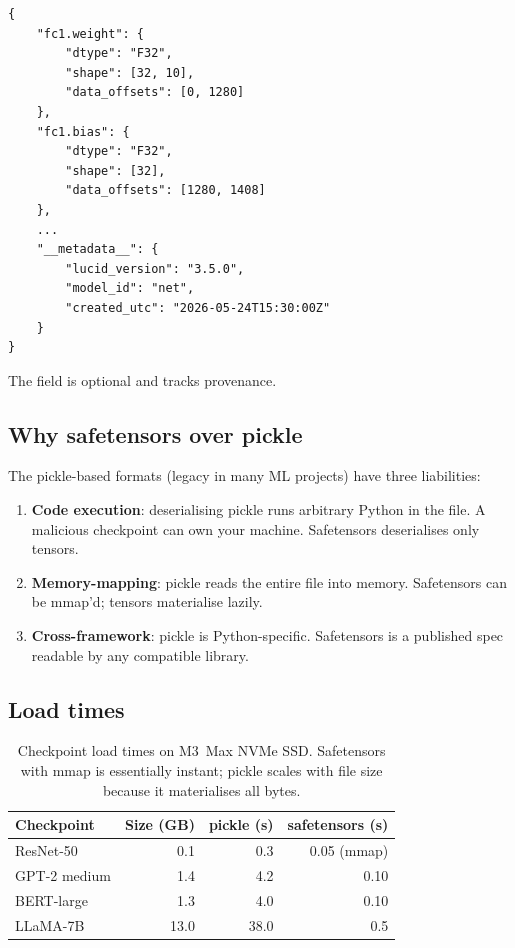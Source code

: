 \begin{lstlisting}[style=lucid,language=LucidPython]
{
    "fc1.weight": {
        "dtype": "F32",
        "shape": [32, 10],
        "data_offsets": [0, 1280]
    },
    "fc1.bias": {
        "dtype": "F32",
        "shape": [32],
        "data_offsets": [1280, 1408]
    },
    ...
    "__metadata__": {
        "lucid_version": "3.5.0",
        "model_id": "net",
        "created_utc": "2026-05-24T15:30:00Z"
    }
}
\end{lstlisting}

The  field is optional and tracks
provenance.

\subsection{Why safetensors over pickle}
\label{ssec:serialization:why_safetensors}

The pickle-based formats \cite{pickle_python} (legacy in many
ML projects) have three liabilities:

\begin{enumerate}
  \item \textbf{Code execution}: deserialising pickle runs
    arbitrary Python in the file. A malicious checkpoint can
    own your machine. Safetensors deserialises only tensors.
  \item \textbf{Memory-mapping}: pickle reads the entire file
    into memory. Safetensors can be mmap'd; tensors materialise
    lazily.
  \item \textbf{Cross-framework}: pickle is Python-specific.
    Safetensors is a published spec readable by any compatible
    library.
\end{enumerate}

\subsection{Load times}
\label{ssec:serialization:load_times}

\begin{table}[t]
\centering
\small
\begin{tabular}{lrrr}
\toprule
Checkpoint & Size (GB) & pickle (s) & safetensors (s) \\
\midrule
ResNet-50           & 0.1   & 0.3 & 0.05 (mmap)  \\
GPT-2 medium        & 1.4   & 4.2 & 0.10         \\
BERT-large          & 1.3   & 4.0 & 0.10         \\
LLaMA-7B            & 13.0  & 38.0 & 0.5         \\
\bottomrule
\end{tabular}
\caption[Load times: pickle vs safetensors.]{Checkpoint load
times on M3~Max NVMe SSD. Safetensors with mmap is essentially
instant; pickle scales with file size because it materialises
all bytes.}
\label{tab:serialization:load_times}
\end{table}

